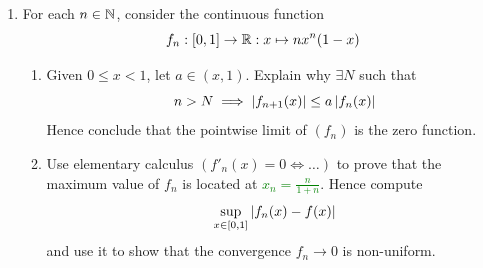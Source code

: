 \begin{exercises}
\begin{enumerate}
	\item\label{ex:classicnonuniform} For each $n\in\mathbb{N}$, consider the continuous function
	\[f_n:[0,1]\to\mathbb{R}:x\mapsto nx^n(1-x)\]
	\begin{enumerate}
	  \item Given $0\le x<1$, let $a\in(x,1)$. Explain why
	   $\exists N$ such that
	  \[n>N\implies \left| f_{n+1}(x)\right|\le a\left| f_n(x)\right|\]
	  Hence conclude that the pointwise limit of $(f_n)$ is the zero function.
	  \item Use elementary calculus $(f'_n(x)=0\iff\ldots)$ to prove that the maximum value of $f_n$ is located at \textcolor{Green}{$x_n=\frac n{1+n}$}. Hence compute
		\[\sup_{x\in[0,1]}\left| f_n(x)-f(x)\right|\]
		and use it to show that the convergence $f_n\to 0$ is non-uniform.
	\end{enumerate}
	

\end{enumerate}
\end{exercises}
